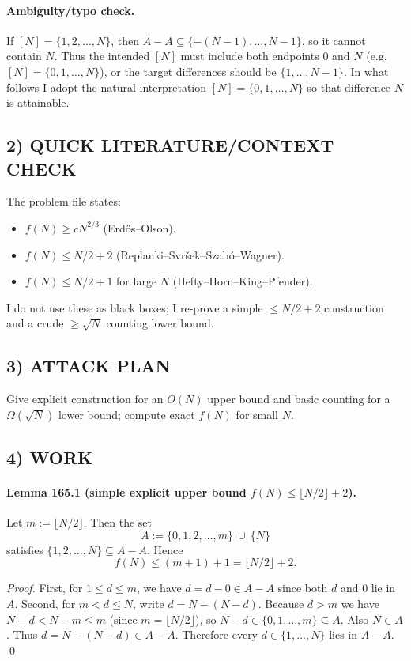 \paragraph{Ambiguity/typo check.}
If $[N]=\{1,2,\dots,N\}$, then $A-A\subseteq\{-(N-1),\dots,N-1\}$, so it cannot contain $N$.
Thus the intended $[N]$ must include both endpoints $0$ and $N$ (e.g. $[N]=\{0,1,\dots,N\}$), or the target differences should be $\{1,\dots,N-1\}$.
In what follows I adopt the natural interpretation $[N]=\{0,1,\dots,N\}$ so that difference $N$ is attainable.

\subsection*{2) QUICK LITERATURE/CONTEXT CHECK}
The problem file states:
\begin{itemize}
\item $f(N)\ge c N^{2/3}$ (Erd\H{o}s--Olson).
\item $f(N)\le N/2+2$ (Replanki--Svr\v{s}ek--Szab\'{o}--Wagner).
\item $f(N)\le N/2+1$ for large $N$ (Hefty--Horn--King--Pfender).
\end{itemize}
I do not use these as black boxes; I re-prove a simple $\le N/2+2$ construction and a crude $\ge \sqrt N$ counting lower bound.

\subsection*{3) ATTACK PLAN}
Give explicit construction for an $O(N)$ upper bound and basic counting for a $\Omega(\sqrt N)$ lower bound; compute exact $f(N)$ for small $N$.

\subsection*{4) WORK}
\paragraph{Lemma 165.1 (simple explicit upper bound $f(N)\le \lfloor N/2\rfloor+2$).}
Let $m:=\lfloor N/2\rfloor$. Then the set
\[
A:=\{0,1,2,\dots,m\}\ \cup\ \{N\}
\]
satisfies $\{1,2,\dots,N\}\subseteq A-A$. Hence
\[
f(N)\le (m+1)+1=\lfloor N/2\rfloor+2.
\]

\textit{Proof.}
First, for $1\le d\le m$, we have $d=d-0\in A-A$ since both $d$ and $0$ lie in $A$.
Second, for $m< d\le N$, write $d=N-(N-d)$. Because $d>m$ we have $N-d < N-m\le m$ (since $m=\lfloor N/2\rfloor$), so $N-d\in\{0,1,\dots,m\}\subseteq A$.
Also $N\in A$. Thus $d=N-(N-d)\in A-A$.
Therefore every $d\in\{1,\dots,N\}$ lies in $A-A$. \qed

